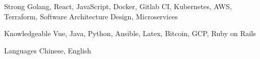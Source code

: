 

\begin{cvskills}

  \cvskill
    {Strong} %
    {Golang, React, JavaScript, Docker, Gitlab CI, Kubernetes, AWS, Terraform, Software Architecture Design, Microservices} %

  \cvskill
    {Knowledgeable} %
    {Vue, Java, Python, Ansible, Latex, Bitcoin, GCP, Ruby on Rails} %

  \cvskill
    {Languages} %
    {Chinese, English} %

\end{cvskills}
